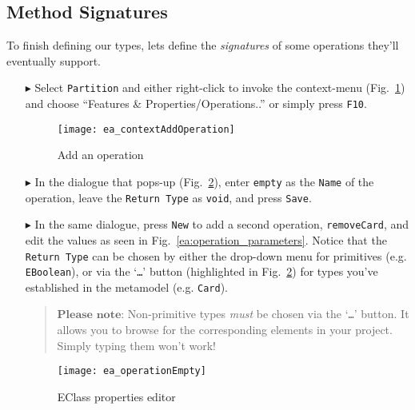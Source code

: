 \newpage
\subsection{Method Signatures}
\visHeader
\hypertarget{static:methods vis}{}

To finish defining our types, lets define the \emph{signatures} of some operations they'll eventually support.

\begin{enumerate}

\item[$\blacktriangleright$] Select \texttt{Partition} and either right-click to invoke the context-menu (Fig.~\ref{ea:add_operation})  and choose ``Features \&
Properties/Operations..'' or simply press \texttt{F10}.

\begin{figure}[htbp]
	\centering
  \texttt{[image: ea\_contextAddOperation]}
	\caption{Add an operation}
	\label{ea:add_operation}
\end{figure}
\FloatBarrier

\item[$\blacktriangleright$] In the dialogue that pops-up (Fig.~\ref{ea:operation_properties}), enter \texttt{empty} as the \texttt{Name} of the operation,
leave the \texttt{Return Type} as \texttt{void}, and press \texttt{Save}. 

\vspace{0.5cm}

\item[$\blacktriangleright$] In the same dialogue, press \texttt{New} to add a second operation, \texttt{removeCard}, and edit the values as seen in 
Fig.~\ref{ea:operation_parameters}. Notice that the \texttt{Return Type} can be chosen by either the drop-down menu for
primitives (e.g. \texttt{EBoolean}), or via the `\texttt{\ldots}' button (highlighted in Fig.~\ref{ea:operation_properties}) for types you've established in
the metamodel (e.g. \texttt{Card}).
\vspace{-.3cm}
\begin{quote}
{ \small
$\textbf{Please note:}$ Non-primitive types \emph{must} be chosen via the `\texttt{\ldots}' button. It allows you to browse for the corresponding elements in
your project. Simply typing them won't work!
}
\end{quote}

\begin{figure}[htbp]
	\centering
  	\texttt{[image: ea\_operationEmpty]}
	\caption{EClass properties editor}
	\label{ea:operation_properties}
\end{figure}



\end{enumerate}

